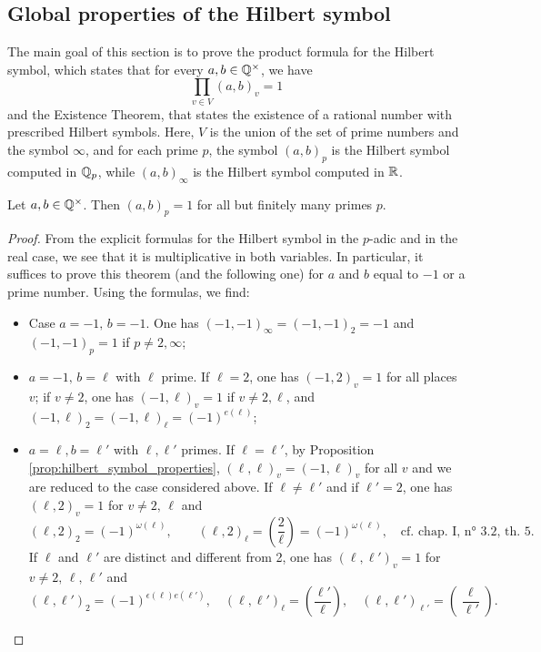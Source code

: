 \subsection{Global properties of the Hilbert symbol}
The main goal of this section is to prove
the product formula for the Hilbert symbol, which states that for every $a, b \in \mathbb{Q}^\times$, we have
\[\prod_{v \in V} (a, b)_v = 1\]
and the Existence Theorem, that states the existence of a rational number with prescribed Hilbert symbols.
Here, $V$ is the union of the set of prime numbers and the symbol $\infty$, and for each prime $p$,
the symbol $(a, b)_p$ is the Hilbert symbol computed in $\mathbb{Q}_p$, while $(a, b)_\infty$ is the Hilbert
symbol computed in $\mathbb{R}$.


\begin{theorem}
	\label{thm:almost_all_one}
	\leanok
Let $a, b \in \mathbb{Q}^\times$. Then $(a, b)_p = 1$ for all but finitely many primes $p$.
\end{theorem}

\begin{proof}
\leanok
	From the explicit formulas for the Hilbert symbol in the $p$-adic and in the real case, we see
	that it is multiplicative in both variables. 	In particular, it suffices to prove this theorem
	(and the following one) for $a$ and $b$ equal to $-1$ or
	a prime number. Using the formulas, we find:
	\begin{itemize}
	\item Case $a = -1, \, b = -1$. One has $(-1, -1)_\infty = (-1, -1)_2 = -1$ and
	$(-1, -1)_p = 1$ if $p \ne 2, \infty$;
  \item $a = -1, \, b = \ell$ with $\ell$ prime. If $\ell=2$, one has $(-1, 2)_v = 1$
	for all places $v$; if $v \ne 2$, one has $(-1, \ell)_v = 1$ if $v \ne 2, \ell$,
	and $(-1, \ell)_2 = (-1, \ell)_{\ell} = (-1)^{e(\ell)}$;
  \item $a = \ell, b = \ell'$ with $\ell, \ell'$ primes. If $\ell = \ell'$, by Proposition
	\ref{prop:hilbert_symbol_properties}, $(\ell, \ell)_v = (-1, \ell)_v$ for all $v$ and we are
	reduced to the case considered above. If $\ell \ne \ell'$ and if $\ell' = 2$, one has
	$(\ell, 2)_v = 1$ for $v \ne 2, \, \ell$ and
\[
(\ell, 2)_2 = (-1)^{\omega(\ell)}, \qquad (\ell, 2)_{\ell} = \left(\frac{2}{\ell}\right) = (-1)^{\omega(\ell)}, \quad \text{cf. chap. I, n° 3.2, th. 5.}
\]
If \( \ell \) and \( \ell' \) are distinct and different from 2, one has \( (\ell, \ell')_v = 1 \) for \( v \neq 2, \, \ell, \, \ell' \) and
\[
(\ell, \ell')_2 = (-1)^{\epsilon(\ell)e(\ell')}, \quad (\ell, \ell')_{\ell} = \left(\frac{\ell'}{\ell}\right), \quad (\ell, \ell')_{\ell'} = \left(\frac{\ell}{\ell'}\right).
\]
\end{itemize}
\end{proof}

